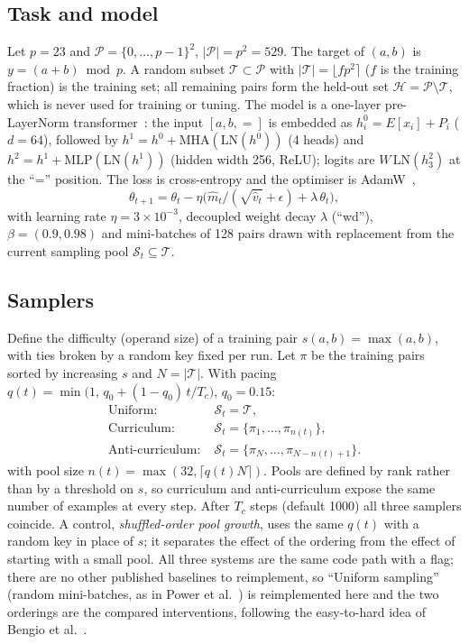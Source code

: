 \subsection{Task and model}
Let $p=23$ and $\mathcal{P}=\{0,\dots,p-1\}^2$, $|\mathcal{P}|=p^2=529$. The target of $(a,b)$ is $y=(a+b)\bmod p$. A random subset $\mathcal{T}\subset\mathcal{P}$ with $|\mathcal{T}|=\lfloor f p^2\rceil$ ($f$ is the training fraction) is the training set; all remaining pairs form the held-out set $\mathcal{H}=\mathcal{P}\setminus\mathcal{T}$, which is never used for training or tuning. The model is a one-layer pre-LayerNorm transformer~\cite{vaswani2017attention}: the input $[a,b,{=}]$ is embedded as $h^{0}_i=E[x_i]+P_i$ ($d=64$), followed by $h^{1}=h^{0}+\mathrm{MHA}(\mathrm{LN}(h^{0}))$ (4 heads) and $h^{2}=h^{1}+\mathrm{MLP}(\mathrm{LN}(h^{1}))$ (hidden width 256, ReLU); logits are $W\,\mathrm{LN}(h^{2}_{3})$ at the ``='' position. The loss is cross-entropy and the optimiser is AdamW~\cite{loshchilov2017decoupled},
\begin{equation}
\theta_{t+1}=\theta_t-\eta\Big(\hat m_t/(\sqrt{\hat v_t}+\epsilon)+\lambda\,\theta_t\Big),
\end{equation}
with learning rate $\eta=3\times10^{-3}$, decoupled weight decay $\lambda$ (``wd''), $\beta=(0.9,0.98)$ and mini-batches of 128 pairs drawn with replacement from the current sampling pool $\mathcal{S}_t\subseteq\mathcal{T}$.

\subsection{Samplers}
Define the difficulty (operand size) of a training pair $s(a,b)=\max(a,b)$, with ties broken by a random key fixed per run. Let $\pi$ be the training pairs sorted by increasing $s$ and $N=|\mathcal{T}|$. With pacing $q(t)=\min\!\big(1,\,q_0+(1-q_0)\,t/T_c\big)$, $q_0=0.15$:
\begin{align}
\text{Uniform:}\;& \mathcal{S}_t=\mathcal{T},\\
\text{Curriculum:}\;& \mathcal{S}_t=\{\pi_1,\dots,\pi_{n(t)}\},\\
\text{Anti-curriculum:}\;& \mathcal{S}_t=\{\pi_N,\dots,\pi_{N-n(t)+1}\}.
\end{align}
with pool size $n(t)=\max(32,\lceil q(t)N\rceil)$. Pools are defined by rank rather than by a threshold on $s$, so curriculum and anti-curriculum expose the same number of examples at every step. After $T_c$ steps (default 1000) all three samplers coincide. A control, \emph{shuffled-order pool growth}, uses the same $q(t)$ with a random key in place of $s$; it separates the effect of the ordering from the effect of starting with a small pool. All three systems are the same code path with a flag; there are no other published baselines to reimplement, so ``Uniform sampling'' (random mini-batches, as in Power et al.~\cite{power2022grokking}) is reimplemented here and the two orderings are the compared interventions, following the easy-to-hard idea of Bengio et al.~\cite{bengio2009curriculum}.

